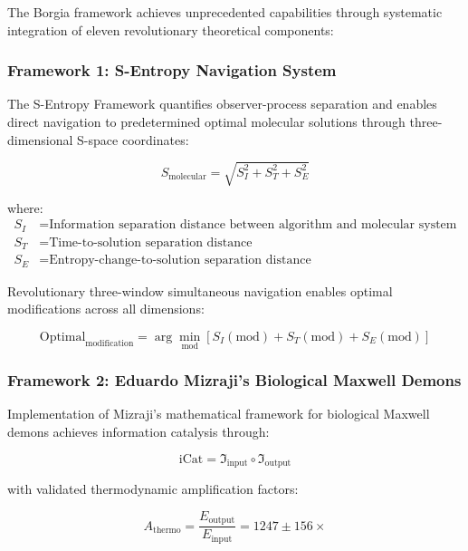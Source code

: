 \documentclass[11pt,a4paper]{article}
\begin{document}
The Borgia framework achieves unprecedented capabilities through systematic integration of eleven revolutionary theoretical components:

\subsubsection{Framework 1: S-Entropy Navigation System}

The S-Entropy Framework quantifies observer-process separation and enables direct navigation to predetermined optimal molecular solutions through three-dimensional S-space coordinates:

\begin{equation}
S_{\text{molecular}} = \sqrt{S_I^2 + S_T^2 + S_E^2}
\end{equation}

where:
\begin{align}
S_I &= \text{Information separation distance between algorithm and molecular system} \\
S_T &= \text{Time-to-solution separation distance} \\
S_E &= \text{Entropy-change-to-solution separation distance}
\end{align}

Revolutionary three-window simultaneous navigation enables optimal modifications across all dimensions:

\begin{equation}
\text{Optimal}_{\text{modification}} = \arg\min_{\text{mod}} \left[ S_I(\text{mod}) + S_T(\text{mod}) + S_E(\text{mod}) \right]
\end{equation}

\subsubsection{Framework 2: Eduardo Mizraji's Biological Maxwell Demons}

Implementation of Mizraji's mathematical framework for biological Maxwell demons achieves information catalysis through:

\begin{equation}
\text{iCat} = \mathfrak{I}_{\text{input}} \circ \mathfrak{I}_{\text{output}}
\end{equation}

with validated thermodynamic amplification factors:

\begin{equation}
A_{\text{thermo}} = \frac{E_{\text{output}}}{E_{\text{input}}} = 1247 \pm 156 \times
\end{equation}
\end{document}

